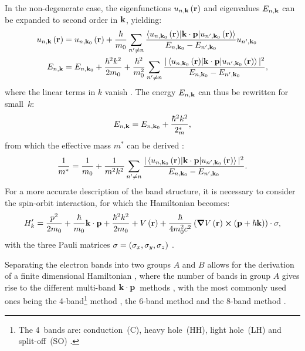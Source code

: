 In the non-degenerate case, the eigenfunctions $u_{n,\vb{k}}\left(\vb{r}\right)$ and eigenvalues $E_{n,\vb{k}}$ can be expanded to second order in $\vb{k}$, yielding:
\begin{align}
  u_{n,\vb{k}}\left(\vb{r}\right) &= u_{n,\vb{k}_0}\left(\vb{r}\right) + \frac{\hbar}{m_0}\sum_{n'\neq n} \frac{\mel**{u_{n,\vb{k}_0}\left(\vb{r}\right)}{\vb{k}\cdot\vb{p}}{u_{n',\vb{k}_0}\left(\vb{r}\right)}}{E_{n,\vb{k}_0} - E_{n',\vb{k}_0}} u_{n',\vb{k}_0} \\
  E_{n,\vb{k}} &= E_{n,\vb{k}_0} + \frac{\hbar^2k^2}{2m_0} + \frac{\hbar^2}{m_0^2}\sum_{n' \neq n} \frac{|\mel**{u_{n,\vb{k}_0}\left(\vb{r}\right)}{\vb{k}\cdot\vb{p}}{u_{n',\vb{k}_0}\left(\vb{r}\right)}|^2}{E_{n,\vb{k}_0} - E_{n',\vb{k}_0}},
\end{align}
where the linear terms in $k$ vanish \cite{Kittel1987,Piprek2003,Yu2010}. The energy $E_{n,\vb{k}}$ can thus be rewritten for small~$k$:
\begin{equation}
  E_{n,\vb{k}} = E_{n,\vb{k}_0} + \frac{\hbar^2k^2}{2_m^\ast},
\end{equation}
from which the effective mass $m^\ast$ can be derived \cite{Kittel1987,Piprek2003,Yu2010}:
\begin{equation}
  \frac{1}{m^\ast} = \frac{1}{m_0} + \frac{1}{m^2k^2} \sum_{n' \neq n} \frac{|\mel**{u_{n,\vb{k}_0}\left(\vb{r}\right)}{\vb{k}\cdot\vb{p}}{u_{n',\vb{k}_0}\left(\vb{r}\right)}|^2}{E_{n,\vb{k}_0} - E_{n',\vb{k}_0}}.
\end{equation}
For a more accurate description of the band structure, it is necessary to consider the spin-orbit interaction, for which the Hamiltonian becomes:
\begin{equation}
  H_k' = \frac{p^2}{2m_0} + \frac{\hbar}{m_0}\vb{k}\cdot\vb{p} + \frac{\hbar^2k^2}{2m_0} + V\left(\vb{r}\right) + \frac{\hbar}{4m_0^2c^2} \left(\grad V\left(\vb{r}\right) \cp \left(\vb{p} + \hbar\vb{k}\right)\right) \cdot \vb{\sigma},
\end{equation}
with the three Pauli matrices $\vb{\sigma} = \left(\sigma_x, \sigma_y, \sigma_z\right)$ \cite{Kittel1987,Piprek2003,Yu2010}.

Separating the electron bands into two groups $A$ and $B$ allows for the derivation of a finite dimensional Hamiltonian \cite{Loewdin1951,Kane1966}, where the number of bands in group $A$ gives rise to the different multi-band $\vb{k}\cdot\vb{p}$~methods \cite{Luttinger1955,Luttinger1956}, with the most commonly used ones being the 4-band\footnote{The 4~bands are: conduction~(C), heavy hole~(HH), light hole~(LH) and split-off~(SO) \cite{Deen2012,Piprek2003}.} method \cite{Deen2012,Piprek2003}, the 6-band method \cite{Chao1992,Zhukov2013} and the 8-band method \cite{Kane1957,Chuang1996,Bahder1990,Enders1995}.
